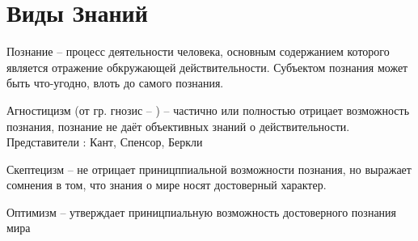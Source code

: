 \documentclass[12pt,a4paper]{book}
\begin{document}
\section{Виды Знаний}
Познание -- процесс деятельности человека, основным содержанием которого является отражение обкружающей действительности. Субъектом познания может быть что-угодно, влоть до самого познания.

Агностицизм (от гр. гнозис -- ) -- частично или полностью отрицает возможность  познания, познание не даёт объективных знаний о действительности. Представители : Кант, Спенсор, Беркли

Скептецизм -- не отрицает приницппиальной возможности познания, но выражает сомнения в том, что знания о мире носят достоверный характер.

Оптимизм -- утверждает приницпиальную возможность достоверного познания мира
\end{document}
